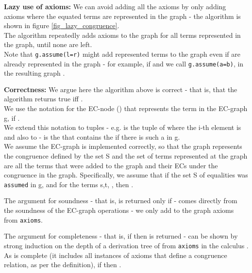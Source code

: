 \bigskip
\noindent
\textbf{Lazy use of axioms:}
We can avoid adding all the axioms by only adding axioms where the equated terms are represented in the graph - the algorithm is shown in figure \ref{fig_lazy_congruence}.\\
The algorithm repeatedly adds axioms to the graph for all terms represented in the graph, until none are left.\\
Note that \lstinline|g.assume(l=r)| might add represented terms to the graph even if  are already represented in the graph - for example, if  and we call
\lstinline|g.assume(a=b)|, in the resulting graph  .

\textbf{Correctness:}
We argue here the algorithm above is correct - that is, that the algorithm returns true iff .\\
We use the notation  for the EC-node (\GT{}) that represents the term  in the EC-graph g, if .\\
We extend this notation to tuples - e.g.  is the tuple of \GTs{} where the i-th element is  and also to \GFAs{} - \m{[f([\tup{s}]_g)]} is the \GT{} that contains the \GFA{} \m{f([\tup{s}]_g)]} if there is such a \GFA{} in g.\\
We assume the EC-graph is implemented correctly, so that the graph represents the congruence defined by the set S and the set of terms represented at the graph are all the terms that were added to the graph and their ECs under the congruence in the graph. 
Specifically, we assume that if the set S of equalities was \lstinline|assumed| in g, and for the terms s,t, , then .

The argument for soundness - that is, \true{} is returned only if  - comes directly from the soundness of the EC-graph operations - we only add to the graph axioms from \lstinline|axioms|.

The argument for completeness - that is, if  then \true{} is returned - can be shown by strong induction on the depth of a derivation tree of  from \lstinline|axioms| in the calculus .\\
As  is complete (it includes all instances of axioms that define a congruence relation, as per the definition),
if  then .

